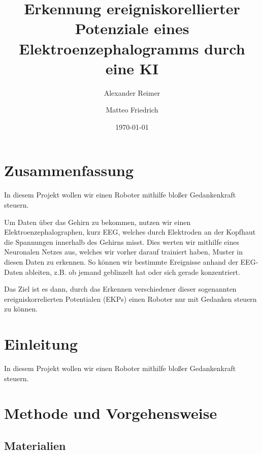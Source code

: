 \documentclass{scrartcl}
\title{Erkennung ereigniskorellierter Potenziale eines Elektroenzephalogramms durch eine KI }
\date{\today}
\author{Alexander Reimer \and Matteo Friedrich}
\begin{document}
	\maketitle

	\newpage
	
	\tableofcontents
	
	\newpage

	\section{Zusammenfassung}

	In diesem Projekt wollen wir einen Roboter mithilfe bloßer Gedankenkraft steuern.
	
	Um Daten über das Gehirn zu bekommen, nutzen wir einen Elektroenzephalographen, kurz EEG, welches durch Elektroden an der Kopfhaut die Spannungen innerhalb des Gehirns misst. Dies werten wir mithilfe eines Neuronalen Netzes aus, welches wir vorher darauf trainiert haben, Muster in diesen Daten zu erkennen. So können wir bestimmte Ereignisse anhand der EEG-Daten ableiten, z.B. ob jemand geblinzelt hat oder sich gerade konzentriert.
	
	Das Ziel ist es dann, durch das Erkennen verschiedener dieser sogenannten ereigniskorrelierten Potentialen (EKPs) einen Roboter nur mit Gedanken steuern zu können. 

	\section{Einleitung}
	In diesem Projekt wollen wir einen Roboter mithilfe bloßer Gedankenkraft steuern.
	\section{Methode und Vorgehensweise}

	\subsection{Materialien} \label{Materialien}
\end{document}
